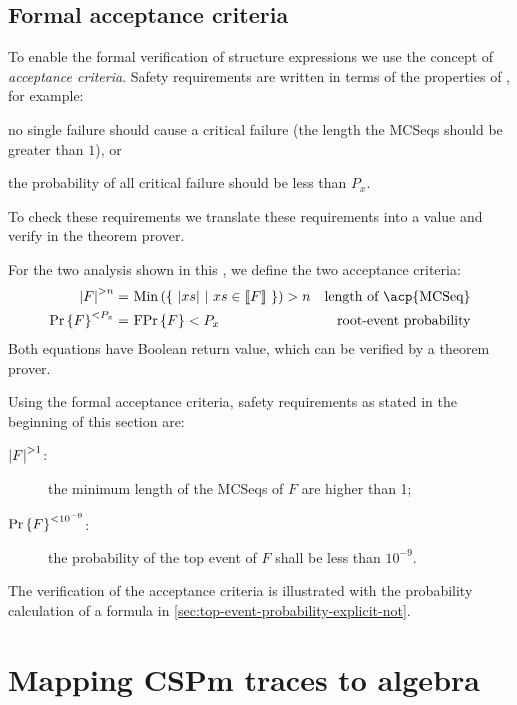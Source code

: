 \subsection{Formal acceptance criteria}
\label{sec:formal-acceptance-criteria}

To enable the formal verification of structure expressions we use the concept of \emph{acceptance criteria}.
Safety requirements are written in terms of the properties of , for example: 
\begin{alineasinline}
  \item no single failure should cause a critical failure (the length the \acp{MCSeq} should be greater than $1$), or 
  \item the probability of all critical failure should be less than $P_x$.
\end{alineasinline}
To check these requirements we translate these requirements into a value and verify in the theorem prover.

For the two analysis shown in this , we define the two acceptance criteria:
%
\begin{subequations}
\begin{align}
\lengthacceptance{F}{n} = &~ \Min{\left\{~ \length{xs} ~\middle|~ xs \in \denote{F} ~\right\}} > n & \text{length of \acp{MCSeq}}\\
%
\probacceptance{F}{P_x} = &~ \formulaprob{F} < P_x & \text{root-event probability}
\end{align}
\end{subequations}
%
Both equations have Boolean return value, which can be verified by a theorem prover.

Using the formal acceptance criteria, safety requirements as stated in the beginning of this section are:
%
\begin{description}
	\item[$\left|F\right|^{>1}$:] the minimum length of the \acp{MCSeq} of $F$ are higher than 1;
	\item[$\Pr\left\{F\right\}^{<10^{-9}}$: ] the probability of the top event of $F$ shall be less than $10^{-9}$.
\end{description}

The verification of the acceptance criteria is illustrated with the probability calculation of a formula in \cref{sec:top-event-probability-explicit-not}.

\section{Mapping \ac*{CSPm} traces to \ac*{algebra}}
\label{sec:mapping-cspm-algebra}

